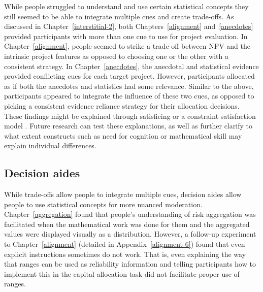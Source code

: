 \documentclass[a4paper, nobind, dvipsnames]{templates/ociamthesis}
\theoremstyle{definition}
\theoremstyle{definition}
\theoremstyle{definition}
\theoremstyle{definition}
\theoremstyle{remark}
\begin{document}
While people struggled to understand and use certain statistical concepts they
still seemed to be able to integrate multiple cues and create trade-offs. As
discussed in Chapter~\ref{interstitial-2}, both Chapters~\ref{alignment}
and~\ref{anecdotes} provided participants with more than one cue to use for
project evaluation. In Chapter~\ref{alignment}, people seemed to strike a
trade-off between NPV and the intrinsic project features as opposed to choosing
one or the other with a consistent strategy. In Chapter~\ref{anecdotes}, the
anecdotal and statistical evidence provided conflicting cues for each target
project. However, participants allocated as if both the anecdotes and statistics
had some relevance. Similar to the above, participants appeared to integrate the
influence of these two cues, as opposed to picking a consistent evidence
reliance strategy for their allocation decisions. These findings might be
explained through satisficing \autocite{simon1955} or a constraint satisfaction model
\autocite[e.g.,][]{glockner2014}. Future research can test these explanations, as well as
further clarify to what extent constructs such as need for cognition or
mathematical skill may explain individual differences.

\subsection{Decision aides}

While trade-offs allow people to integrate multiple cues, decision aides allow
people to use statistical concepts for more nuanced moderation.
Chapter~\ref{aggregation} found that people's understanding of risk aggregation
was facilitated when the mathematical work was done for them and the aggregated
values were displayed visually as a distribution. However, a follow-up
experiment to Chapter~\ref{alignment} (detailed in Appendix~\ref{alignment-6})
found that even explicit instructions sometimes do not work. That is, even
explaining the way that ranges can be used as reliability information and
telling participants how to implement this in the capital allocation task did
not facilitate proper use of ranges.
\end{document}
